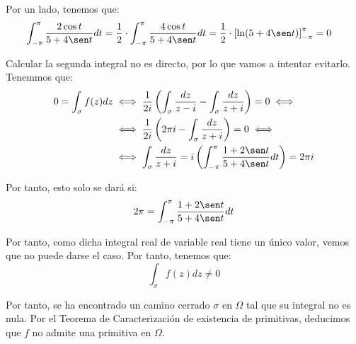 \begin{ejercicio}
    Por un lado, tenemos que:
    \begin{align*}
        \int_{-\pi}^{\pi} \frac{2\cos t}{{5+4\sen t}}dt
        &= \dfrac{1}{2}\cdot \int_{-\pi}^{\pi} \frac{4\cos t}{{5+4\sen t}}dt
        = \dfrac{1}{2}\cdot \left[\ln(5+4\sen t)\right]_{-\pi}^{\pi}
        = 0
    \end{align*}

    Calcular la segunda integral no es directo, por lo que vamos a intentar evitarlo. Tenemmos que:
    \begin{align*}
        0 = \int_{\sigma} f(z)dz &\iff  \dfrac{1}{2i}\left(\int_{\sigma} \frac{dz}{z-i} - \int_{\sigma} \frac{dz}{z+i}\right) = 0\iff
        \\&\iff \dfrac{1}{2i}\left(2\pi i-\int_{\sigma} \frac{dz}{z+i}\right) = 0\iff
        \\&\iff \int_{\sigma} \frac{dz}{z+i} = i\left(\int_{-\pi}^{\pi} \frac{1+2\sen t}{{5+4\sen t}}dt\right) = 2\pi i
    \end{align*}

    Por tanto, esto solo se dará si:
    \begin{equation*}
        2\pi = \int_{-\pi}^{\pi} \frac{1+2\sen t}{{5+4\sen t}}dt
    \end{equation*}


    Por tanto, como dicha integral real de variable real tiene un único valor, vemos que no puede darse el caso. Por tanto, tenemos que:
    \begin{equation*}
        \int_{\sigma} f(z)dz \neq 0
    \end{equation*}

    Por tanto, se ha encontrado un camino cerrado $\sigma$ en $\Omega$ tal que su integral no es nula. Por el Teorema de Caracterización de existencia de primitivas, deducimos que $f$ no admite una primitiva en $\Omega$.
\end{ejercicio}

